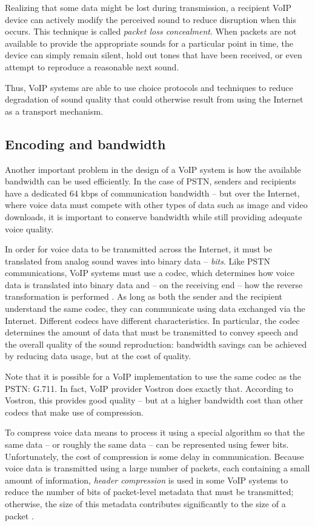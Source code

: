 \documentclass[11pt]{article}
\newcommand{\term}[1]{\textit{#1}}
\begin{document}
Realizing that some data might be lost during transmission, a recipient VoIP
device can actively modify the perceived sound to reduce disruption when this
occurs. This technique is called \term{packet loss concealment}. When packets
are not available to provide the appropriate sounds for a particular point in
time, the device can simply remain silent, hold out tones that have been
received, or even attempt to reproduce a reasonable next sound. \cite{coding}

Thus, VoIP systems are able to use choice protocols and techniques to reduce
degradation of sound quality that could otherwise result from using the Internet
as a transport mechanism.

\subsection{Encoding and bandwidth}

Another important problem in the design of a VoIP system is how the available
bandwidth can be used efficiently. In the case of PSTN, senders and recipients
have a dedicated 64 kbps of communication bandwidth \cite{privateline} -- but
over the Internet, where voice data must compete with other types of data such
as image and video downloads, it is important to conserve bandwidth while still
providing adequate voice quality.

In order for voice data to be transmitted across the Internet, it must be
translated from analog sound waves into binary data -- \term{bits}. Like PSTN
communications, VoIP systems must use a codec, which determines how voice data
is translated into binary data and -- on the receiving end -- how the reverse
transformation is performed \cite{goode}. As long as both the sender and the
recipient understand the same codec, they can communicate using data exchanged
via the Internet. Different codecs have different characteristics. In
particular, the codec determines the amount of data that must be transmitted to
convey speech and the overall quality of the sound reproduction: bandwidth
savings can be achieved by reducing data usage, but at the cost of quality.
\cite{goode}

Note that it is possible for a VoIP implementation to use the same codec as the
PSTN: G.711. In fact, VoIP provider Vostron does exactly that. According to
Vostron, this provides good quality -- but at a higher bandwidth cost than other
codecs that make use of compression. \cite{vostron}

To compress voice data means to process it using a special algorithm so that the
same data -- or roughly the same data -- can be represented using fewer bits.
Unfortunately, the cost of compression is some delay in communication.
\cite{goode} Because voice data is transmitted using a large number of packets,
each containing a small amount of information, \term{header compression} is used
in some VoIP systems to reduce the number of bits of packet-level metadata that
must be transmitted; otherwise, the size of this metadata contributes
significantly to the size of a packet \cite{hsdpa}.
\end{document}

